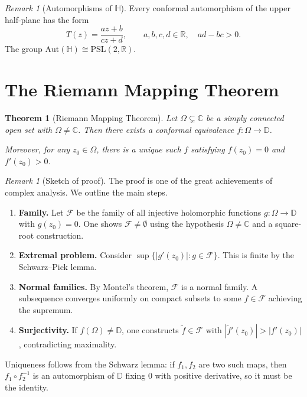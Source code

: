 \documentclass[12pt,a4paper,openany]{book}
\theoremstyle{definition}
\theoremstyle{plain}
\newtheorem{theorem}[definition]{Theorem}
\theoremstyle{remark}
\newtheorem{remark}[definition]{Remark}
\newcommand{\C}{\mathbb{C}}
\newcommand{\R}{\mathbb{R}}
\newcommand{\D}{\mathbb{D}}
\newcommand{\abs}[1]{\left|#1\right|}
\begin{document}
\begin{remark}[Automorphisms of $\mathbb{H}$]\label{rem:aut-H}
Every conformal automorphism of the upper half-plane has the form
\[
  T(z)=\frac{az+b}{cz+d},\qquad a,b,c,d\in\R,\quad ad-bc>0.
\]
The group $\mathrm{Aut}(\mathbb{H})\cong\mathrm{PSL}(2,\R)$.
\end{remark}

\section{The Riemann Mapping Theorem}\label{sec:riemann-mapping}

\begin{theorem}[Riemann Mapping Theorem]\label{thm:riemann-mapping}
Let $\Omega\subsetneq\C$ be a simply connected open set with
$\Omega\neq\C$.  Then there exists a conformal equivalence
$f\colon\Omega\to\D$.

Moreover, for any $z_0\in\Omega$, there is a unique such $f$
satisfying $f(z_0)=0$ and $f'(z_0)>0$.
\end{theorem}

\begin{remark}[Sketch of proof]\label{rem:riemann-proof}
The proof is one of the great achievements of complex analysis.  We
outline the main steps.

\begin{enumerate}[label=\textbf{Step~\arabic*:}]
  \item \textbf{Family.}
  Let $\mathcal{F}$ be the family of all injective holomorphic functions
  $g\colon\Omega\to\D$ with $g(z_0)=0$.  One shows $\mathcal{F}\neq
  \emptyset$ using the hypothesis $\Omega\neq\C$ and a square-root
  construction.

  \item \textbf{Extremal problem.}
  Consider $\sup\{\abs{g'(z_0)}:g\in\mathcal{F}\}$.  This is finite by
  the Schwarz--Pick lemma.

  \item \textbf{Normal families.}
  By Montel's theorem, $\mathcal{F}$ is a normal family.  A subsequence
  converges uniformly on compact subsets to some $f\in\mathcal{F}$
  achieving the supremum.

  \item \textbf{Surjectivity.}
  If $f(\Omega)\neq\D$, one constructs $\tilde{f}\in\mathcal{F}$ with
  $\abs{\tilde{f}'(z_0)}>\abs{f'(z_0)}$, contradicting maximality.
\end{enumerate}

Uniqueness follows from the Schwarz lemma: if $f_1,f_2$ are two such
maps, then $f_1\circ f_2^{-1}$ is an automorphism of $\D$ fixing $0$
with positive derivative, so it must be the identity.
\end{remark}
\end{document}
